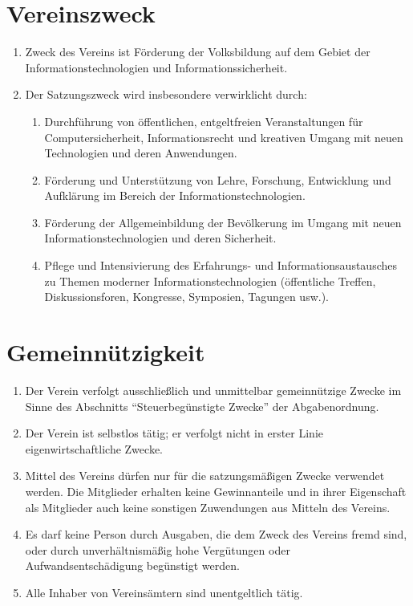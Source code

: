 \documentclass[a4paper,ngerman]{scrartcl}
\begin{document}
\section{Vereinszweck}
\begin{enumerate}
\item Zweck des Vereins ist Förderung der Volksbildung auf dem Gebiet der Informationstechnologien und Informationssicherheit.
\item Der Satzungszweck wird insbesondere verwirklicht durch:
\begin{enumerate}
\item Durchführung von öffentlichen, entgeltfreien Veranstaltungen für Computersicherheit, Informationsrecht und kreativen Umgang mit neuen Technologien und deren Anwendungen.
\item Förderung und Unterstützung von Lehre, Forschung, Entwicklung und Aufklärung im Bereich der Informationstechnologien.
\item Förderung der Allgemeinbildung der Bevölkerung im Umgang mit neuen Informationstechnologien und deren Sicherheit.
\item Pflege und Intensivierung des Erfahrungs- und Informationsaustausches zu Themen moderner Informationstechnologien (öffentliche Treffen, Diskussionsforen, Kongresse, Symposien, Tagungen usw.).
\end{enumerate}
\end{enumerate}

\section{Gemeinnützigkeit}
\begin{enumerate}
\item Der Verein verfolgt ausschließlich und unmittelbar gemeinnützige Zwecke im Sinne des Abschnitts "`Steuerbegünstigte Zwecke"' der Abgabenordnung.
\item Der Verein ist selbstlos tätig; er verfolgt nicht in erster Linie eigenwirtschaftliche Zwecke.
\item Mittel des Vereins dürfen nur für die satzungsmäßigen Zwecke verwendet werden. Die Mitglieder erhalten keine Gewinnanteile und in ihrer Eigenschaft als Mitglieder auch keine sonstigen Zuwendungen aus Mitteln des Vereins.
\item Es darf keine Person durch Ausgaben, die dem Zweck des Vereins fremd sind, oder durch unverhältnismäßig hohe Vergütungen oder Aufwandsentschädigung begünstigt werden.
\item Alle Inhaber von Vereinsämtern sind unentgeltlich tätig.
\end{enumerate}
\end{document}
